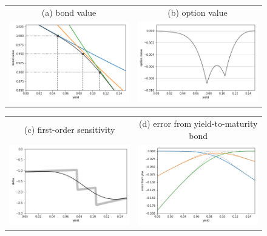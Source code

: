 \documentclass[10pt,a4paper]{article}
\begin{document}
\begin{figure}[h!]
	\begin{center}
		\begin{tabular}{cc}
			(a) bond value & (b) option value \\
		\includegraphics[width=7cm]{pics/pv-sy.png}
		&
		\includegraphics[width=7cm]{pics/option-value.png}
		\end{tabular}
	
		\begin{tabular}{cc}
			(c) first-order sensitivity & (d) error from yield-to-maturity bond\\
			\includegraphics[width=7cm]{pics/delta.png}
			&
			\includegraphics[width=7cm]{pics/error-profile-sy.png}
		\end{tabular}
		

\end{center}
\end{figure}
\end{document}

